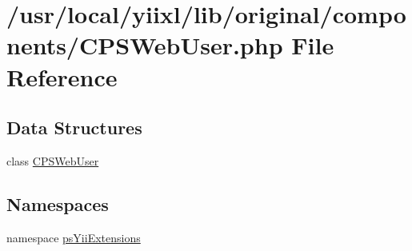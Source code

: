 \hypertarget{CPSWebUser_8php}{
\section{/usr/local/yiixl/lib/original/components/CPSWebUser.php File Reference}
\label{CPSWebUser_8php}
}
\subsection*{Data Structures}
\begin{DoxyCompactItemize}
\item 
class \hyperlink{classCPSWebUser}{CPSWebUser}
\end{DoxyCompactItemize}
\subsection*{Namespaces}
\begin{DoxyCompactItemize}
\item 
namespace \hyperlink{namespacepsYiiExtensions}{psYiiExtensions}
\end{DoxyCompactItemize}

